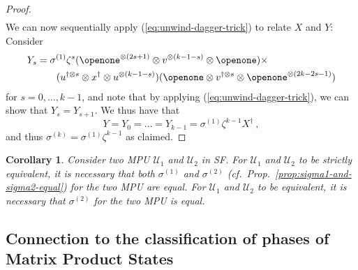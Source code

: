 \documentclass[pra,twocolumn,nofootinbib,superscriptaddress]{revtex4-1}
\newtheorem{cor}[thm]{Corollary}
\begin{document}
\begin{proof}
\begin{align*}
	\end{align*}
	We can now sequentially apply (\ref{eq:unwind-dagger-trick}) to relate
	$X$ and $Y$: Consider
	\begin{align*}
		Y_s & = \sigma^{(1)}\zeta^s
		(\openone^{\otimes (2s+1)}\otimes  v^{\otimes(k-1-s)}\otimes\openone)
		\times
		\\
		    & \qquad
		( u^{\dagger\otimes s}\otimes x^\dagger \otimes  u^{\otimes (k-1-s)})
		(\openone\otimes  v^{\dagger\otimes s}\otimes\openone^{\otimes (2k-2s-1)})
	\end{align*}
	for $s=0,\dots,k-1$,
	and note that by applying (\ref{eq:unwind-dagger-trick}), we can show that
	$Y_s=Y_{s+1}$.  We thus have that
	\[
		Y=Y_0=\dots=Y_{k-1}=\sigma^{(1)}\zeta^{k-1}X^\dagger\ ,
	\]
	and thus $\sigma^{(k)} = \sigma^{(1)}\zeta^{k-1}$ as claimed.
\end{proof}


\begin{cor}
	Consider two MPU $\mathcal U_1$ and $\mathcal U_2$ in SF. For $\mathcal
		U_1$ and $\mathcal U_2$ to be strictly equivalent, it is necessary that
	both $\sigma^{(1)}$ and $\sigma^{(2)}$
	(cf.~Prop.~\ref{prop:sigma1-and-sigma2-equal}) for the two MPU are equal.
	For $\mathcal U_1$ and $\mathcal U_2$ to be equivalent, it is necessary
	that $\sigma^{(2)}$ for the two MPU is equal.
\end{cor}



\subsection{Connection to the classification of phases of Matrix Product
	States}
\end{document}
